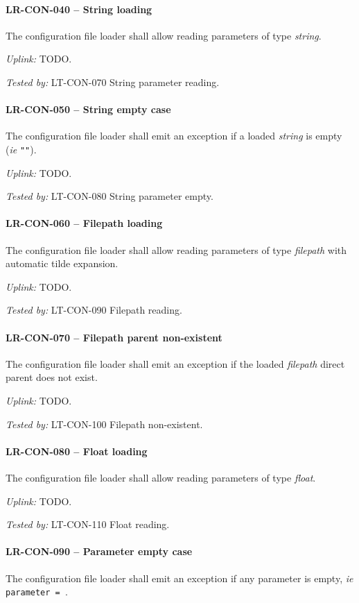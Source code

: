 \paragraph{LR-CON-040 -- String loading}
The configuration file loader shall allow reading parameters of type
\emph{string}.

\textit{Uplink: } TODO.

\textit{Tested by: } LT-CON-070 String parameter reading.

\paragraph{LR-CON-050 -- String empty case}
The configuration file loader shall emit an exception if a loaded
\emph{string} is empty (\textit{ie} \lstinline{""}).

\textit{Uplink: } TODO.

\textit{Tested by: } LT-CON-080 String parameter empty.

\paragraph{LR-CON-060 -- Filepath loading}
The configuration file loader shall allow reading parameters of type
\emph{filepath} with automatic tilde expansion.

\textit{Uplink: } TODO.

\textit{Tested by: } LT-CON-090 Filepath reading.

\paragraph{LR-CON-070 -- Filepath parent non-existent}
The configuration file loader shall emit an exception if the loaded
\emph{filepath} direct parent does not exist.

\textit{Uplink: } TODO.

\textit{Tested by: } LT-CON-100 Filepath non-existent.

\paragraph{LR-CON-080 -- Float loading}
The configuration file loader shall allow reading parameters of type
\emph{float}.

\textit{Uplink: } TODO.

\textit{Tested by: } LT-CON-110 Float reading.

\paragraph{LR-CON-090 -- Parameter empty case}
The configuration file loader shall emit an exception if any parameter
is empty, \textit{ie} \lstinline{parameter = }.

